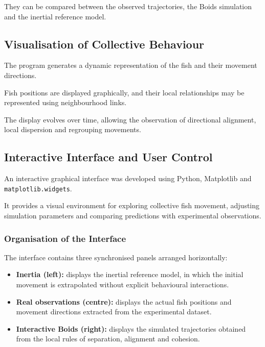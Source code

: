 \documentclass[10pt,a4paper]{article}
\begin{document}
They can be compared between the observed
trajectories, the Boids simulation and
the inertial reference model.

\subsection{Visualisation of Collective Behaviour}

The program generates a dynamic representation
of the fish and their movement directions.

Fish positions are displayed graphically,
and their local relationships may be represented
using neighbourhood links.

The display evolves over time, allowing
the observation of directional alignment,
local dispersion and regrouping movements.

\subsection{Interactive Interface and User Control}
\label{app:interactive-interface}

An interactive graphical interface was developed
using Python, Matplotlib and
\texttt{matplotlib.widgets}.

It provides a visual environment for exploring
collective fish movement, adjusting simulation
parameters and comparing predictions with
experimental observations.

\subsubsection*{Organisation of the Interface}

The interface contains three synchronised
panels arranged horizontally:

\begin{itemize}
    \item \textbf{Inertia (left):}
    displays the inertial reference model,
    in which the initial movement is
    extrapolated without explicit
    behavioural interactions.

    \item \textbf{Real observations (centre):}
    displays the actual fish positions
    and movement directions extracted
    from the experimental dataset.

    \item \textbf{Interactive Boids (right):}
    displays the simulated trajectories
    obtained from the local rules of
    separation, alignment and cohesion.
\end{itemize}
\end{document}
